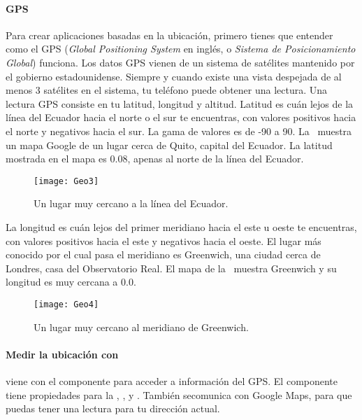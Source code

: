 \paragraph{GPS}

Para crear aplicaciones basadas en la ubicación, primero tienes que
entender como el GPS (\emph{Global Positioning System} en inglés, o
\emph{Sistema de Posicionamiento Global}) funciona. Los datos GPS
vienen de un sistema de satélites mantenido por el gobierno
estadounidense. Siempre y cuando existe una vista despejada de al
menos 3 satélites en el sistema, tu teléfono puede obtener una
lectura. Una lectura GPS consiste en tu latitud, longitud y
altitud. Latitud es cuán lejos de la línea del Ecuador hacia el norte
o el sur te encuentras, con valores positivos hacia el norte y
negativos hacia el sur. La gama de valores es de -90 a
90. La~ muestra un mapa Google de un lugar cerca de
Quito, capital del Ecuador. La latitud mostrada en el mapa es 0.08,
apenas al norte de la línea del Ecuador.

\begin{figure}[H]
  \centering
  \texttt{[image: Geo3]}
  \caption{Un lugar muy cercano a la línea del Ecuador.}
  \label{fig:Geo3}
\end{figure}

La longitud es cuán lejos del primer meridiano hacia el este u oeste
te encuentras, con valores positivos hacia el este y negativos hacia
el oeste. El lugar más conocido por el cual pasa el meridiano es
Greenwich, una ciudad cerca de Londres, casa del Observatorio Real. El
mapa de la~ muestra Greenwich y su longitud es muy
cercana a $0.0$.

\begin{figure}[H]
  \centering
  \texttt{[image: Geo4]}
  \caption{Un lugar muy cercano al meridiano de Greenwich.}
  \label{fig:Geo4}
\end{figure}

\paragraph{Medir la ubicación con \AppInventor}

\AppInventor viene con el componente 
para acceder a información del GPS. El componente tiene propiedades
para la , , y
. También secomunica con Google Maps, para que
puedas tener una lectura para tu dirección actual.

